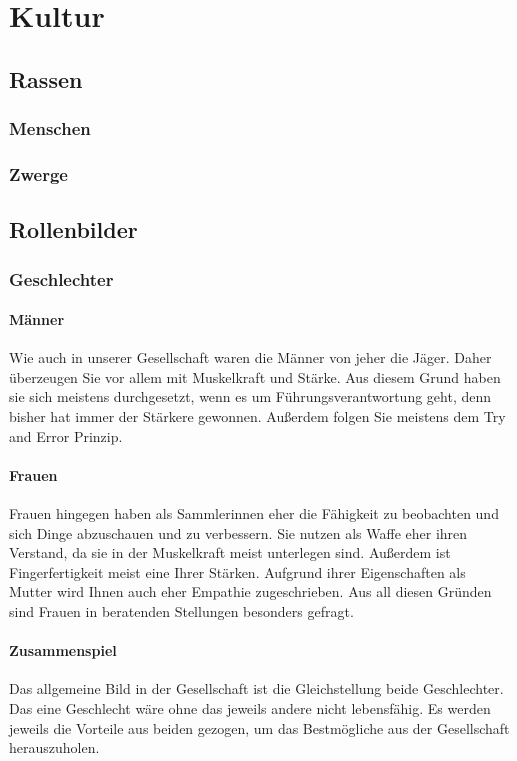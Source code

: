 \chapter{Kultur}
\section{Rassen}
\subsection{Menschen}
\subsection{Zwerge}

\section{Rollenbilder}
\subsection{Geschlechter}
\subsubsection{Männer} 
Wie auch in unserer Gesellschaft waren die Männer von jeher die Jäger. Daher überzeugen Sie vor allem mit Muskelkraft und Stärke. Aus diesem Grund haben sie sich meistens durchgesetzt, wenn es um Führungsverantwortung geht, denn bisher hat immer der Stärkere gewonnen. Außerdem folgen Sie meistens dem Try and Error Prinzip.
	
\subsubsection{Frauen} 
Frauen hingegen haben als Sammlerinnen eher die Fähigkeit zu beobachten und sich Dinge abzuschauen und zu verbessern. Sie nutzen als Waffe eher ihren Verstand, da sie in der Muskelkraft meist unterlegen sind. Außerdem ist Fingerfertigkeit meist eine Ihrer Stärken. Aufgrund ihrer Eigenschaften als Mutter wird Ihnen auch eher Empathie zugeschrieben. Aus all diesen Gründen sind Frauen in beratenden Stellungen besonders gefragt.
	
\subsubsection{Zusammenspiel}
Das allgemeine Bild in der Gesellschaft ist die Gleichstellung beide Geschlechter. Das eine Geschlecht wäre ohne das jeweils andere nicht lebensfähig. Es werden jeweils die Vorteile aus beiden gezogen, um das Bestmögliche aus der Gesellschaft herauszuholen.

